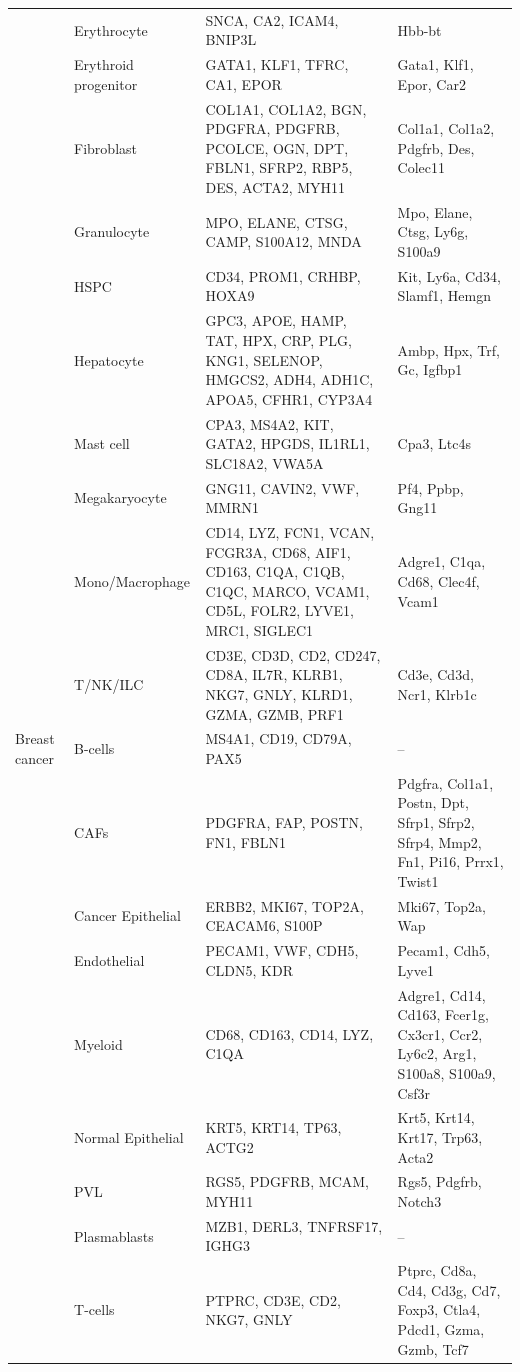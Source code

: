 {\begin{longtable}{@{} p{} p{} p{} p{} @{}}
 & Erythrocyte & SNCA, CA2, ICAM4, BNIP3L & Hbb-bt \\
 & Erythroid progenitor & GATA1, KLF1, TFRC, CA1, EPOR & Gata1, Klf1, Epor, Car2 \\
 & Fibroblast & COL1A1, COL1A2, BGN, PDGFRA, PDGFRB, PCOLCE, OGN, DPT, FBLN1, SFRP2, RBP5, DES, ACTA2, MYH11 & Col1a1, Col1a2, Pdgfrb, Des, Colec11 \\
 & Granulocyte & MPO, ELANE, CTSG, CAMP, S100A12, MNDA & Mpo, Elane, Ctsg, Ly6g, S100a9 \\
 & HSPC & CD34, PROM1, CRHBP, HOXA9 & Kit, Ly6a, Cd34, Slamf1, Hemgn \\
 & Hepatocyte & GPC3, APOE, HAMP, TAT, HPX, CRP, PLG, KNG1, SELENOP, HMGCS2, ADH4, ADH1C, APOA5, CFHR1, CYP3A4 & Ambp, Hpx, Trf, Gc, Igfbp1 \\
 & Mast cell & CPA3, MS4A2, KIT, GATA2, HPGDS, IL1RL1, SLC18A2, VWA5A & Cpa3, Ltc4s \\
 & Megakaryocyte & GNG11, CAVIN2, VWF, MMRN1 & Pf4, Ppbp, Gng11 \\
 & Mono/Macrophage & CD14, LYZ, FCN1, VCAN, FCGR3A, CD68, AIF1, CD163, C1QA, C1QB, C1QC, MARCO, VCAM1, CD5L, FOLR2, LYVE1, MRC1, SIGLEC1 & Adgre1, C1qa, Cd68, Clec4f, Vcam1 \\
 & T/NK/ILC & CD3E, CD3D, CD2, CD247, CD8A, IL7R, KLRB1, NKG7, GNLY, KLRD1, GZMA, GZMB, PRF1 & Cd3e, Cd3d, Ncr1, Klrb1c \\
\midrule
Breast cancer & B-cells & MS4A1, CD19, CD79A, PAX5 & -- \\
 & CAFs & PDGFRA, FAP, POSTN, FN1, FBLN1 & Pdgfra, Col1a1, Postn, Dpt, Sfrp1, Sfrp2, Sfrp4, Mmp2, Fn1, Pi16, Prrx1, Twist1 \\
 & Cancer Epithelial & ERBB2, MKI67, TOP2A, CEACAM6, S100P & Mki67, Top2a, Wap \\
 & Endothelial & PECAM1, VWF, CDH5, CLDN5, KDR & Pecam1, Cdh5, Lyve1 \\
 & Myeloid & CD68, CD163, CD14, LYZ, C1QA & Adgre1, Cd14, Cd163, Fcer1g, Cx3cr1, Ccr2, Ly6c2, Arg1, S100a8, S100a9, Csf3r \\
 & Normal Epithelial & KRT5, KRT14, TP63, ACTG2 & Krt5, Krt14, Krt17, Trp63, Acta2 \\
 & PVL & RGS5, PDGFRB, MCAM, MYH11 & Rgs5, Pdgfrb, Notch3 \\
 & Plasmablasts & MZB1, DERL3, TNFRSF17, IGHG3 & -- \\
 & T-cells & PTPRC, CD3E, CD2, NKG7, GNLY & Ptprc, Cd8a, Cd4, Cd3g, Cd7, Foxp3, Ctla4, Pdcd1, Gzma, Gzmb, Tcf7 \\
\end{longtable}
}
